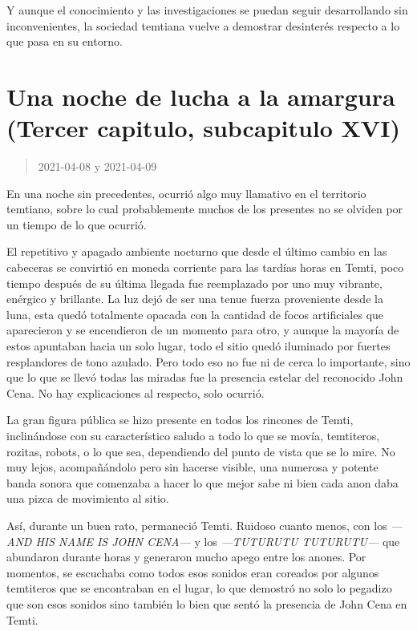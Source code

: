 \documentclass[
  spanish,
]{book}
\begin{document}
Y aunque el conocimiento y las investigaciones se puedan seguir desarrollando sin inconvenientes, la sociedad temtiana vuelve a demostrar desinterés respecto a lo que pasa en su entorno.

\hypertarget{una-noche-de-lucha-a-la-amargura-tercer-capitulo-subcapitulo-xvi}{%
\section{Una noche de lucha a la amargura (Tercer capitulo, subcapitulo XVI)}\label{una-noche-de-lucha-a-la-amargura-tercer-capitulo-subcapitulo-xvi}}

\begin{quote}
2021-04-08 y 2021-04-09
\end{quote}

En una noche sin precedentes, ocurrió algo muy llamativo en el territorio temtiano, sobre lo cual probablemente muchos de los presentes no se olviden por un tiempo de lo que ocurrió.

El repetitivo y apagado ambiente nocturno que desde el último cambio en las cabeceras se convirtió en moneda corriente para las tardías horas en Temti, poco tiempo después de su última llegada fue reemplazado por uno muy vibrante, enérgico y brillante. La luz dejó de ser una tenue fuerza proveniente desde la luna, esta quedó totalmente opacada con la cantidad de focos artificiales que aparecieron y se encendieron de un momento para otro, y aunque la mayoría de estos apuntaban hacia un solo lugar, todo el sitio quedó iluminado por fuertes resplandores de tono azulado. Pero todo eso no fue ni de cerca lo importante, sino que lo que se llevó todas las miradas fue la presencia estelar del reconocido John Cena. No hay explicaciones al respecto, solo ocurrió.

La gran figura pública se hizo presente en todos los rincones de Temti, inclinándose con su característico saludo a todo lo que se movía, temtiteros, rozitas, robots, o lo que sea, dependiendo del punto de vista que se lo mire. No muy lejos, acompañándolo pero sin hacerse visible, una numerosa y potente banda sonora que comenzaba a hacer lo que mejor sabe ni bien cada anon daba una pizca de movimiento al sitio.

Así, durante un buen rato, permaneció Temti. Ruidoso cuanto menos, con los \emph{---AND HIS NAME IS JOHN CENA---} y los \emph{---TUTURUTU TUTURUTU---} que abundaron durante horas y generaron mucho apego entre los anones. Por momentos, se escuchaba como todos esos sonidos eran coreados por algunos temtiteros que se encontraban en el lugar, lo que demostró no solo lo pegadizo que son esos sonidos sino también lo bien que sentó la presencia de John Cena en Temti.
\end{document}
